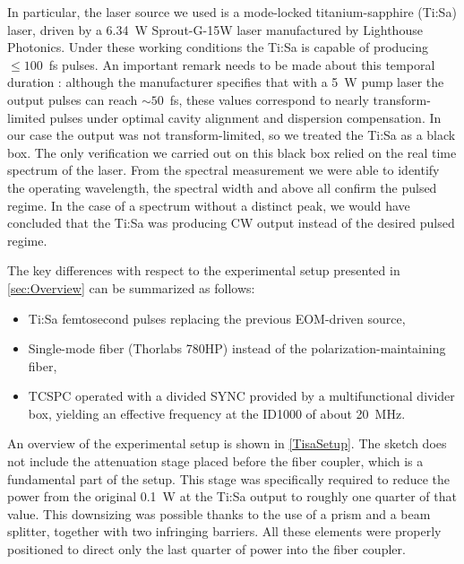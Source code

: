 In particular, the laser source we used is a mode-locked titanium-sapphire (Ti:Sa) laser, driven by a 6.34~W Sprout-G-15W laser manufactured by Lighthouse Photonics. Under these working conditions the Ti:Sa is capable of producing $\leq 100$~fs pulses. An important remark needs to be made about this temporal duration : although the manufacturer specifies that with a 5~W pump laser the output pulses can reach $\sim 50$~fs, these values correspond to nearly transform-limited pulses under optimal cavity alignment and dispersion compensation. In our case the output was not transform-limited, so we treated the Ti:Sa as a black box. The only verification we carried out on this black box relied on the real time spectrum of the laser. From the spectral measurement we were able to identify the operating wavelength, the spectral width and above all confirm the pulsed regime. In the case of a spectrum without a distinct peak, we would have concluded that the Ti:Sa was producing CW output instead of the desired pulsed regime.

The key differences with respect to the experimental setup presented in \autoref{sec:Overview} can be summarized as follows:
\begin{itemize}
    \item Ti:Sa femtosecond pulses replacing the previous EOM-driven source,
    \item Single-mode fiber (Thorlabs 780HP) instead of the polarization-maintaining fiber,
    \item TCSPC operated with a divided SYNC provided by a multifunctional divider box, yielding an effective frequency at the ID1000 of about 20~MHz.
\end{itemize}

An overview of the experimental setup is shown in \autoref{TisaSetup}. The sketch does not include the attenuation stage placed before the fiber coupler, which is a fundamental part of the setup. This stage was specifically required to reduce the power from the original 0.1~W at the Ti:Sa output to roughly one quarter of that value. This downsizing was possible thanks to the use of a prism and a beam splitter, together with two infringing barriers. All these elements were properly positioned to direct only the last quarter of power into the fiber coupler.


